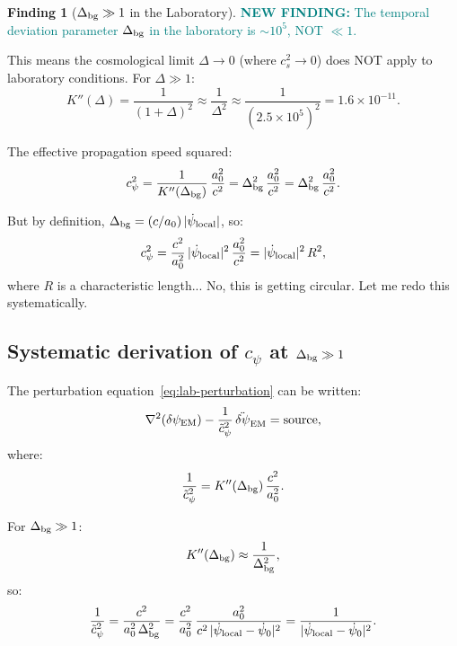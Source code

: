 \documentclass[11pt]{article}
\newcommand{\ee}[1]{\times 10^{#1}}
\newcommand{\dpsiEM}{\delta\psi_{\rm EM}}
\newcommand{\newfinding}[1]{\textcolor{teal}{\textbf{NEW FINDING:} #1}}
\theoremstyle{definition}
\newtheorem{finding}[theorem]{Finding}
\theoremstyle{remark}
\begin{document}
\begin{finding}[$\Delta_{\rm bg} \gg 1$ in the Laboratory]
\label{find:Delta}
\newfinding{The temporal deviation parameter $\Delta_{\rm bg}$ in
the laboratory is $\sim 10^5$, NOT $\ll 1$.}

This means the cosmological limit $\Delta \to 0$ (where $c_s^2 \to 0$)
does NOT apply to laboratory conditions. For $\Delta \gg 1$:
\begin{equation}
K''(\Delta) = \frac{1}{(1+\Delta)^2} \approx \frac{1}{\Delta^2}
\approx \frac{1}{(2.5\ee{5})^2} = 1.6\ee{-11}.
\end{equation}

The effective propagation speed squared:
\begin{equation}
c_\psi^2 = \frac{1}{K''(\Delta_{\rm bg})}\,\frac{a_0^2}{c^2}
= \Delta_{\rm bg}^2\,\frac{a_0^2}{c^2}
= \Delta_{\rm bg}^2\,\frac{a_0^2}{c^2}.
\end{equation}

But by definition, $\Delta_{\rm bg} = (c/a_0)\,|\dot\psi_{\rm local}|$,
so:
\begin{equation}
c_\psi^2 = \frac{c^2}{a_0^2}\,|\dot\psi_{\rm local}|^2\,
\frac{a_0^2}{c^2} = |\dot\psi_{\rm local}|^2\,R^2,
\end{equation}
where $R$ is a characteristic length... No, this is getting circular.
Let me redo this systematically.
\end{finding}

\subsection{Systematic derivation of $c_\psi$ at $\Delta_{\rm bg} \gg 1$}

The perturbation equation~\eqref{eq:lab-perturbation} can be written:
\begin{equation}
\nabla^2(\dpsiEM) - \frac{1}{\tilde{c}_\psi^2}\,
\ddot{\delta\psi}_{\rm EM} = \text{source},
\end{equation}
where:
\begin{equation}
\frac{1}{\tilde{c}_\psi^2} = K''(\Delta_{\rm bg})\,\frac{c^2}{a_0^2}.
\end{equation}

For $\Delta_{\rm bg} \gg 1$:
\begin{equation}
K''(\Delta_{\rm bg}) \approx \frac{1}{\Delta_{\rm bg}^2},
\end{equation}
so:
\begin{equation}
\frac{1}{\tilde{c}_\psi^2} = \frac{c^2}{a_0^2\,\Delta_{\rm bg}^2}
= \frac{c^2}{a_0^2}\,\frac{a_0^2}{c^2\,|\dot\psi_{\rm local}
- \dot\psi_0|^2}
= \frac{1}{|\dot\psi_{\rm local} - \dot\psi_0|^2}.
\end{equation}
\end{document}
